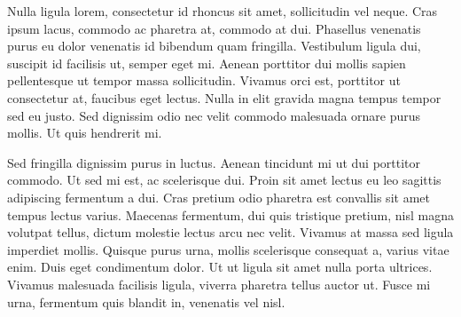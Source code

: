 \documentclass[oneside,11pt]{Classes/PhDthesisPSnPDF}
\begin{document}
\cleardoublepage

\begin{zusamm}
 Nulla ligula lorem, consectetur id rhoncus sit amet, sollicitudin vel neque. Cras ipsum lacus, commodo ac pharetra at, commodo at dui. Phasellus venenatis purus eu dolor venenatis id bibendum quam fringilla. Vestibulum ligula dui, suscipit id facilisis ut, semper eget mi. Aenean porttitor dui mollis sapien pellentesque ut tempor massa sollicitudin. Vivamus orci est, porttitor ut consectetur at, faucibus eget lectus. Nulla in elit gravida magna tempus tempor sed eu justo. Sed dignissim odio nec velit commodo malesuada ornare purus mollis. Ut quis hendrerit mi.

Sed fringilla dignissim purus in luctus. Aenean tincidunt mi ut dui porttitor commodo. Ut sed mi est, ac scelerisque dui. Proin sit amet lectus eu leo sagittis adipiscing fermentum a dui. Cras pretium odio pharetra est convallis sit amet tempus lectus varius. Maecenas fermentum, dui quis tristique pretium, nisl magna volutpat tellus, dictum molestie lectus arcu nec velit. Vivamus at massa sed ligula imperdiet mollis. Quisque purus urna, mollis scelerisque consequat a, varius vitae enim. Duis eget condimentum dolor. Ut ut ligula sit amet nulla porta ultrices. Vivamus malesuada facilisis ligula, viverra pharetra tellus auctor ut. Fusce mi urna, fermentum quis blandit in, venenatis vel nisl.

\end{zusamm}


\setcounter{secnumdepth}{3} %
\setcounter{tocdepth}{3}    %
\tableofcontents            %


\newpage
\mainmatter
\newpage 























\newpage 
\end{document}

